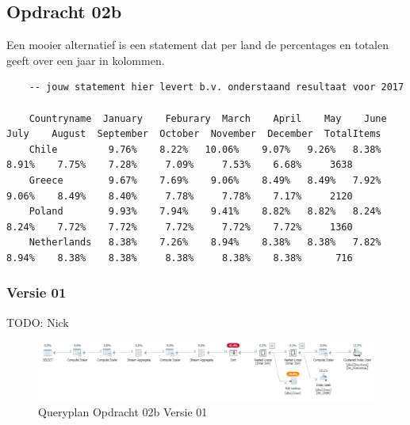 \subsection{Opdracht 02b}
Een mooier alternatief is een statement dat per land de percentages en totalen geeft over een jaar in kolommen.

\begin{lstlisting}
    -- jouw statement hier levert b.v. onderstaand resultaat voor 2017

    Countryname  January	Feburary  March    April    May    June    July    August  September  October  November  December  TotalItems
    Chile         9.76%    8.22%   10.06%    9.07%   9.26%   8.38%   8.91%    7.75%    7.28%     7.09%     7.53%    6.68%     3638
    Greece        9.67%    7.69%    9.06%    8.49%   8.49%   7.92%   9.06%    8.49%    8.40%     7.78%     7.78%    7.17%     2120
    Poland        9.93%    7.94%    9.41%    8.82%   8.82%   8.24%   8.24%    7.72%    7.72%     7.72%     7.72%    7.72%     1360
    Netherlands   8.38%    7.26%    8.94%    8.38%   8.38%   7.82%   8.94%    8.38%    8.38%     8.38%     8.38%    8.38%      716
\end{lstlisting}

\subsubsection{Versie 01}
TODO: Nick

\begin{figure}[H]
    \centering
    \includegraphics[width=1\textwidth]{image/nick/opdracht-02b.PNG}
    \caption{Queryplan Opdracht 02b Versie 01}
\end{figure}

